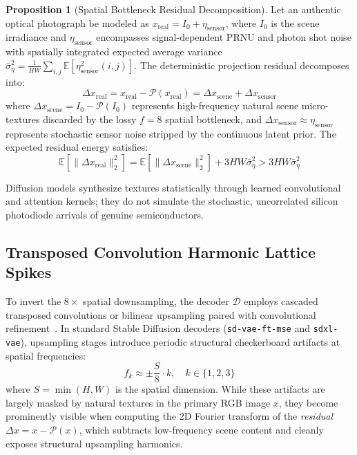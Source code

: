 \documentclass{article}
\theoremstyle{definition}
\newtheorem{proposition}{Proposition}
\begin{document}
\begin{proposition}[Spatial Bottleneck Residual Decomposition]
Let an authentic optical photograph be modeled as $x_{\text{real}} = I_0 + \eta_{\text{sensor}}$, where $I_0$ is the scene irradiance and $\eta_{\text{sensor}}$ encompasses signal-dependent PRNU and photon shot noise with spatially integrated expected average variance $\bar{\sigma}_\eta^2 = \frac{1}{HW}\sum_{i,j}\mathbb{E}[\eta_{\text{sensor}}^2(i, j)]$. The deterministic projection residual decomposes into:
\begin{equation}
\Delta x_{\text{real}} = x_{\text{real}} - \mathcal{P}(x_{\text{real}}) = \Delta x_{\text{scene}} + \Delta x_{\text{sensor}}
\end{equation}
where $\Delta x_{\text{scene}} = I_0 - \mathcal{P}(I_0)$ represents high-frequency natural scene micro-textures discarded by the lossy $f=8$ spatial bottleneck, and $\Delta x_{\text{sensor}} \approx \eta_{\text{sensor}}$ represents stochastic sensor noise stripped by the continuous latent prior. The expected residual energy satisfies:
\begin{equation}
\mathbb{E}\left[ \| \Delta x_{\text{real}} \|_2^2 \right] = \mathbb{E}\left[ \| \Delta x_{\text{scene}} \|_2^2 \right] + 3HW \bar{\sigma}_\eta^2 > 3HW \bar{\sigma}_\eta^2
\end{equation}
\end{proposition}

Diffusion models synthesize textures statistically through learned convolutional and attention kernels; they do not simulate the stochastic, uncorrelated silicon photodiode arrivals of genuine semiconductors.

\subsection{Transposed Convolution Harmonic Lattice Spikes}
To invert the $8\times$ spatial downsampling, the decoder $\mathcal{D}$ employs cascaded transposed convolutions or bilinear upsampling paired with convolutional refinement~\citep{durall2020watch,frank2020leveraging}. In standard Stable Diffusion decoders (\texttt{sd-vae-ft-mse} and \texttt{sdxl-vae}), upsampling stages introduce periodic structural checkerboard artifacts at spatial frequencies:
\begin{equation}
f_k \approx \pm \frac{S}{8} \cdot k, \quad k \in \{1, 2, 3\}
\end{equation}
where $S = \min(H, W)$ is the spatial dimension. While these artifacts are largely masked by natural textures in the primary RGB image $x$, they become prominently visible when computing the 2D Fourier transform of the \textit{residual} $\Delta x = x - \mathcal{P}(x)$, which subtracts low-frequency scene content and cleanly exposes structural upsampling harmonics.
\end{document}
